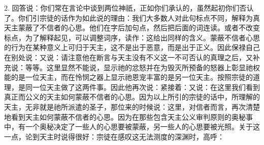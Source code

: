 2. 回答说：你们常在言论中谈到两位神祇，正如你们承认的，虽然起初你们否认了。你们引宗徒的话作为如此说的理由：我们大多数人对此句标点不同，解释为真天主蒙蔽了不信者的心思。他们在字后加句点，然后把后面的词连读。或者不改变标点，为了解释起见，可以调整词序，读作：这给出同样的含义。蒙蔽不信者心思的行为在某种意义上可归于天主，这不是出于恶意，而是出于正义。因此保禄自己在别处说：又说：请注意他在断言与天主没有不义这一不可否认的真理之后，又补充说：等等。这里显然不能说，显示祂的忿怒并在为毁灭所预备的怒器上彰显祂权能的是一位天主，而在怜悯之器上显示祂恩宠丰富的是另一位天主。按照宗徒的道理，是同一位天主做了这两件事。因此他再次说：紧接着：又说：在这里我们看到真正而公义的天主如何蒙蔽不信者的心思。因为以上所引的宗徒的话中，所理解的天主，无非就是祂所派遣的圣子，那位来的时候说：这里，对信者而言，再次清楚地看到天主如何蒙蔽不信者的心思。因为在那些包含天主公义审判原则的奥秘事中，有一个奥秘决定了一些人的心思要被蒙蔽，另一些人的心思要被光照。关于这一点，论到天主时说得很好：宗徒在感叹这无法测度的深渊时，高呼：\par

